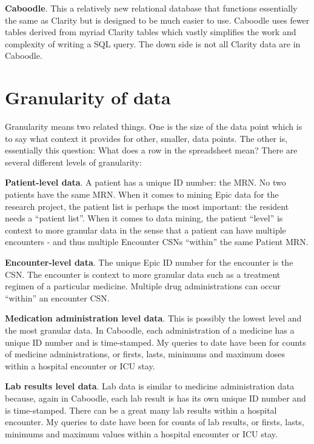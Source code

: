 \documentclass[
]{report}
\begin{document}
\textbf{Caboodle}. This a relatively new relational database that
functions essentially the same as Clarity but is designed to be much
easier to use. Caboodle uses fewer tables derived from myriad Clarity
tables which vastly simplifies the work and complexity of writing a SQL
query. The down side is not all Clarity data are in Caboodle.

\hypertarget{granularity-of-data}{%
\section{Granularity of data}\label{granularity-of-data}}

Granularity means two related things. One is the size of the data point
which is to say what context it provides for other, smaller, data
points. The other is, essentially this question: What does a row in the
spreadsheet mean? There are several different levels of granularity:

\textbf{Patient-level data}. A patient has a unique ID number: the MRN.
No two patients have the same MRN. When it comes to mining Epic data for
the research project, the patient list is perhaps the most important:
the resident needs a ``patient list''. When it comes to data mining, the
patient ``level'' is context to more granular data in the sense that a
patient can have multiple encounters - and thus multiple Encounter CSNs
``within'' the same Patient MRN.

\textbf{Encounter-level data}. The unique Epic ID number for the
encounter is the CSN. The encounter is context to more granular data
such as a treatment regimen of a particular medicine. Multiple drug
administrations can occur ``within'' an encounter CSN.

\textbf{Medication administration level data}. This is possibly the
lowest level and the most granular data. In Caboodle, each
administration of a medicine has a unique ID number and is time-stamped.
My queries to date have been for counts of medicine administrations, or
firsts, lasts, minimums and maximum doses within a hospital encounter or
ICU stay.

\textbf{Lab results level data}. Lab data is similar to medicine
administration data because, again in Caboodle, each lab result is has
its own unique ID number and is time-stamped. There can be a great many
lab results within a hospital encounter. My queries to date have been
for counts of lab results, or firsts, lasts, minimums and maximum values
within a hospital encounter or ICU stay.
\end{document}
